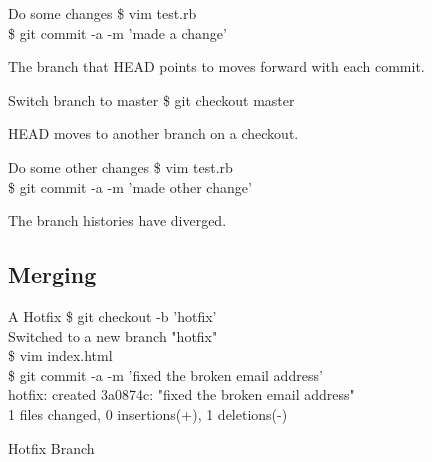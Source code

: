 \documentclass{beamer}
\begin{document}
\begin{frame}{Do some changes}
  \$ vim test.rb\\
  \$ git commit -a -m 'made a change'
\end{frame}

\begin{frame}{The branch that HEAD points to moves forward with each commit.}
    \centering
    \hfill\vfill
\end{frame}

\begin{frame}{Switch branch to master}
  \$ git checkout master
\end{frame}

\begin{frame}{HEAD moves to another branch on a checkout.}
    \centering
    \hfill\vfill
\end{frame}

\begin{frame}{Do some other changes}
  \$ vim test.rb\\
  \$ git commit -a -m 'made other change'
\end{frame}

\begin{frame}{The branch histories have diverged.}
    \centering
    \hfill\vfill
\end{frame}

\subsection{Merging}

\begin{frame}{A Hotfix}
  \$ git checkout -b 'hotfix'\\
  Switched to a new branch "hotfix"\\
  \$ vim index.html\\
  \$ git commit -a -m 'fixed the broken email address'\\
  hotfix: created 3a0874c: "fixed the broken email address"\\
   1 files changed, 0 insertions(+), 1 deletions(-)
\end{frame}

\begin{frame}{Hotfix Branch}
    \centering
    \hfill\vfill
\end{frame}
\end{document}
